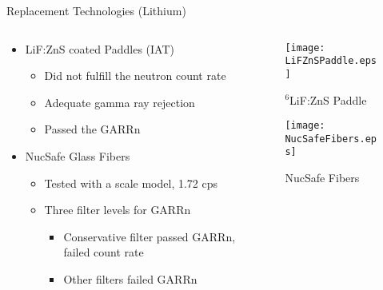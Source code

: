 \begin{frame}{Replacement Technologies (Lithium)}
\begin{columns}[onlytextwidth]
\begin{column}{0.45\textwidth}
\begin{itemize}
	\small
	\item LiF:ZnS coated Paddles (IAT) \cite{kouzes_lithium_2010}
	\begin{itemize}
		\item Did not fulfill the neutron count rate
		\item Adequate gamma ray rejection
		\item Passed the GARRn
	\end{itemize}
	\small
	\item NucSafe Glass Fibers\cite{kouzes_alternative_2010}
	\begin{itemize}
		\item Tested with a scale model, 1.72 cps
		\item Three filter levels for GARRn
		\begin{itemize}
			\tiny
			\item Conservative filter passed GARRn, failed count rate
			\item Other filters failed GARRn
		\end{itemize}
	\end{itemize}
\end{itemize}
\end{column}
\begin{column}{0.45\textwidth}
	\begin{figure}
		\texttt{[image: LiFZnSPaddle.eps]}
		\caption{${}^6$LiF:ZnS Paddle}
		\label{fig:LifZnSPaddle}
		\texttt{[image: NucSafeFibers.eps]}
		\caption{NucSafe Fibers}
		\label{fig:NucSafeFibers}
	\end{figure}
\end{column}
\end{columns}
\end{frame}
